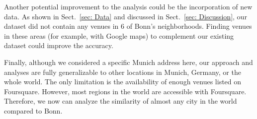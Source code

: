 \documentclass[UKenglish]{scrreprt}
\begin{document}
Another potential improvement to the analysis could be the incorporation of new data. As shown in Sect.~\ref{sec: Data} and discussed in Sect.~\ref{sec: Discussion}, our dataset did not contain any venues in 6 of Bonn's neighborhoods. Finding venues in these areas (for example, with Google maps) to complement our existing dataset could improve the accuracy.

Finally, although we considered a specific Munich address here,  our approach and analyses are fully generalizable to other locations in Munich, Germany, or the whole world. The only limitation is the availability of enough venues listed on Foursquare. However, most regions in the world are accessible with Foursquare. Therefore, we now can analyze the similarity of almost any city in the world compared to Bonn.

\end{document}
